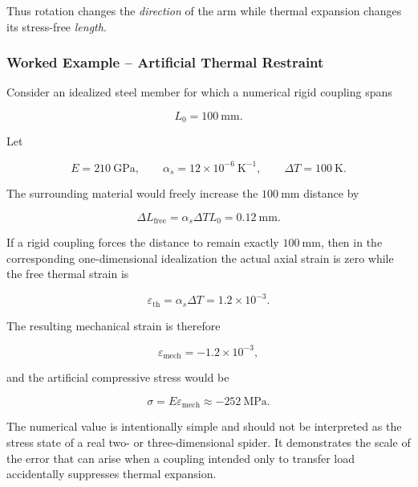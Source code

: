 Thus rotation changes the \emph{direction} of the arm while thermal expansion
changes its stress-free \emph{length}.

\subsubsection{Worked Example -- Artificial Thermal Restraint}

Consider an idealized steel member for which a numerical rigid coupling spans

\begin{equation}
    L_0=100~\mathrm{mm}.
\end{equation}

Let

\begin{equation}
    E=210~\mathrm{GPa},
    \qquad
    \alpha_s=12\times10^{-6}~\mathrm{K}^{-1},
    \qquad
    \Delta T=100~\mathrm{K}.
\end{equation}

The surrounding material would freely increase the $100~\mathrm{mm}$ distance by

\begin{equation}
    \Delta L_{\mathrm{free}}
    =\alpha_s\Delta T L_0
    =0.12~\mathrm{mm}.
\end{equation}

If a rigid coupling forces the distance to remain exactly $100~\mathrm{mm}$,
then in the corresponding one-dimensional idealization the actual axial strain
is zero while the free thermal strain is

\begin{equation}
    \varepsilon_{\mathrm{th}}
    =\alpha_s\Delta T
    =1.2\times10^{-3}.
\end{equation}

The resulting mechanical strain is therefore

\begin{equation}
    \varepsilon_{\mathrm{mech}}
    =-1.2\times10^{-3},
\end{equation}

and the artificial compressive stress would be

\begin{equation}
    \sigma
    =E\varepsilon_{\mathrm{mech}}
    \approx -252~\mathrm{MPa}.
\end{equation}

The numerical value is intentionally simple and should not be interpreted as the
stress state of a real two- or three-dimensional spider. It demonstrates the
scale of the error that can arise when a coupling intended only to transfer load
accidentally suppresses thermal expansion.

